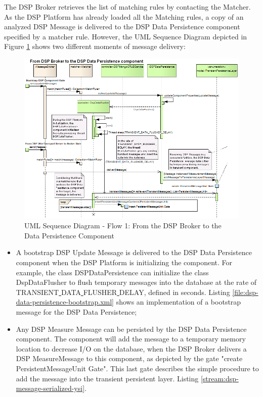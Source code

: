 The DSP Broker retrieves the list of matching rules by contacting the Matcher.
As the DSP Platform has already loaded all the Matching rules, a copy of an
analyzed DSP Message is delivered to the DSP Data Persistence component specified
by a matcher rule. However, the UML Sequence Diagram depicted in Figure 
\ref{fig:From-DSP-Broker-To-DSPDataPersistence-General-Sequence} shows two 
different moments of message delivery:

\begin{figure}[!h]
  \centering
  \includegraphics[scale=0.6]{../diagrams/From-DSP-Broker-To-DSPDataPersistence-General-Sequence} 
  \caption{UML Sequence Diagram - Flow 1: From the DSP Broker to the Data Persistence Component}
  \label{fig:From-DSP-Broker-To-DSPDataPersistence-General-Sequence}
\end{figure}

\begin{itemize}
  \item A bootstrap DSP Update Message is delivered to the DSP Data Persistence
  component when the DSP Platform is initializing the component. For example, the
  class DSPDataPersistence can initialize the class DspDataFlusher to
  flush temporary messages into the database at the rate of
  TRANSIENT\underline{ }DATA\underline{ }FLUSHER\underline{ }DELAY, defined in 
  seconds. 
  Listing \ref{file:dsp-data-persistence-bootstrap.xml} shows an
  implementation of a bootstrap message for the DSP Data Persistence;
  \item Any DSP Measure Message can be persisted by the DSP Data Persistence
  component. The component will add the message to a temporary memory location
  to decrease I/O on the database, when the DSP Broker delivers a DSP
  MeasureMessage to this component, as depicted by the gate "create
  PersistentMessageUnit Gate". This last gate describes the simple procedure
  to add the message into the transient persistent layer. Listing
  \ref{stream:dsp-message-serialized-ysi}.
\end{itemize}

